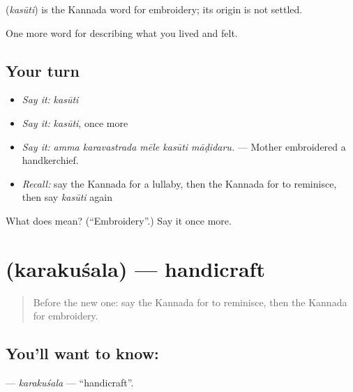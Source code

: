 \begin{cousinweb}
\textbf{} (\emph{kasūti}) is the Kannada word for embroidery; its origin is not settled.
\end{cousinweb}

\begin{grammarlens}[title={What you've built}]
One more word for describing what you lived and felt.
\end{grammarlens}

\subsection*{Your turn}
\begin{itemize}
\raggedright
  \item \emph{Say it:} \emph{kasūti}
  \item \emph{Say it:} \emph{kasūti}, once more
  \item \emph{Say it:} \emph{amma karavastrada mēle kasūti māḍidaru.} — Mother embroidered a handkerchief.
  \item \emph{Recall:} say the Kannada for a lullaby, then the Kannada for to reminisce, then say \emph{kasūti} again
\end{itemize}

\begin{tcolorbox}[breakable,colback=teal!4,colframe=teal!35!black,title={Before you move on}]
What does  mean? (\textquotedblleft{}Embroidery\textquotedblright{}.) Say it once more.
\end{tcolorbox}
\section[\texorpdfstring{\kn{ಕರಕುಶಲ} (karakuśala)}{ಕರಕುಶಲ (karakuśala)}]{ (karakuśala) — handicraft}

\label{lesson:KA-C533-karakusala}



\begin{quote}
Before the new one: say the Kannada for to reminisce, then the Kannada for embroidery.
\end{quote}

\subsection*{You'll want to know: }
\textbf{} — \emph{karakuśala} — \textquotedblleft{}handicraft\textquotedblright{}.

